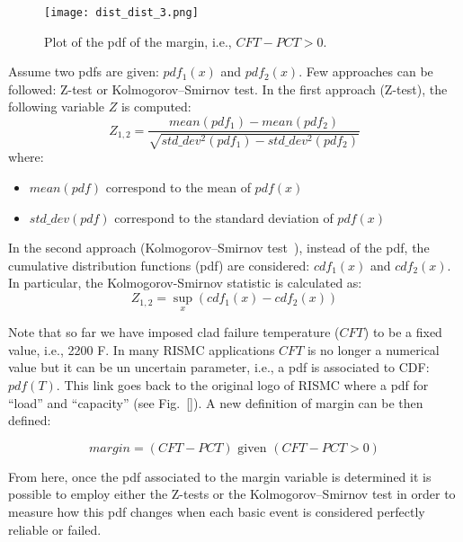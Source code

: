 \begin{figure}
    \centering
    \centerline{\texttt{[image: dist\_dist\_3.png]}}
    \caption{Plot of the pdf of the margin, i.e., $CFT-PCT>0$.}
    \label{fig:dist_dist_3}
\end{figure}

Assume two pdfs are given: $pdf_1(x)$ and $pdf_2(x)$. Few approaches can be followed: Z-test or 
Kolmogorov–Smirnov test. 
In the first approach (Z-test), the following variable $Z$ is computed:
\begin{equation}
  Z_{1,2} = \frac{mean(pdf_1)-mean(pdf_2)}{\sqrt{std\_dev^2 (pdf_1)-std\_dev^2(pdf_2)}} 
  \label{eq:Ztest}
\end{equation}
where:
\begin{itemize}
  \item $mean(pdf)$ correspond to the mean of $pdf(x)$ 
  \item $std\_dev(pdf)$ correspond to the standard deviation of $pdf(x)$ 
\end{itemize}

In the second approach (Kolmogorov–Smirnov test~\cite{}), instead of the pdf, the cumulative 
distribution functions (pdf) are considered: $cdf_1(x)$ and $cdf_2(x)$. 
In particular, the Kolmogorov-Smirnov statistic is calculated as:
\begin{equation}
  Z_{1,2} = \sup_{x} (cdf_1(x) - cdf_2(x))
  \label{eq:Kolmogorov-Smirnov}
\end{equation}

Note that so far we have imposed clad failure temperature ($CFT$) to be a fixed value, 
i.e., 2200 F. 
In many RISMC applications $CFT$ is no longer a numerical value but it can be un uncertain 
parameter, i.e., a pdf is associated to CDF: $pdf(T)$. 
This link goes back to the original logo of RISMC where a pdf for ``load'' and ``capacity'' 
(see Fig.~\ref{}).
A new definition of margin can be then defined:

\begin{equation}
  margin=(CFT-PCT) \text{ given } (CFT-PCT>0)
  \label{eq:new margin}
\end{equation}

From here, once the pdf associated to the margin variable is determined it is possible 
to employ either the Z-tests or the Kolmogorov–Smirnov test in order to measure how this pdf 
changes when each basic event is considered perfectly reliable or failed. 
